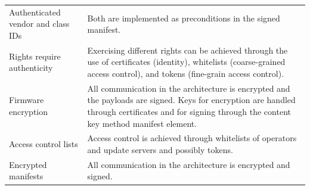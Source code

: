 \documentclass[0-thesis.tex]{subfiles}
\begin{document}
\begin{longtable}[]{@{}ll@{}}
\begin{minipage}[t]{0.37\columnwidth}
    Authenticated vendor and class IDs\strut
    \end{minipage} & \begin{minipage}[t]{0.57\columnwidth}\raggedright\strut
    Both are implemented as preconditions in the signed manifest.\strut
    \end{minipage}\tabularnewline
    \begin{minipage}[t]{0.37\columnwidth}\raggedright\strut
    Rights require authenticity\strut
    \end{minipage} & \begin{minipage}[t]{0.57\columnwidth}\raggedright\strut
    Exercising different rights can be achieved through the use of
    certificates (identity), whitelists (coarse-grained access control), and
    tokens (fine-grain access control).\strut
    \end{minipage}\tabularnewline
    \begin{minipage}[t]{0.37\columnwidth}\raggedright\strut
    Firmware encryption\strut
    \end{minipage} & \begin{minipage}[t]{0.57\columnwidth}\raggedright\strut
    All communication in the architecture is encrypted and the payloads are
    signed. Keys for encryption are handled through certificates and for
    signing through the content key method manifest element.\strut
    \end{minipage}\tabularnewline
    \begin{minipage}[t]{0.37\columnwidth}\raggedright\strut
    Access control lists\strut
    \end{minipage} & \begin{minipage}[t]{0.57\columnwidth}\raggedright\strut
    Access control is achieved through whitelists of operators and update
    servers and possibly tokens.\strut
    \end{minipage}\tabularnewline
    \begin{minipage}[t]{0.37\columnwidth}\raggedright\strut
    Encrypted manifests\strut
    \end{minipage} & \begin{minipage}[t]{0.57\columnwidth}\raggedright\strut
    All communication in the architecture is encrypted and signed.\strut
    \end{minipage}\tabularnewline
    \bottomrule
\end{longtable}
    
\end{document}
